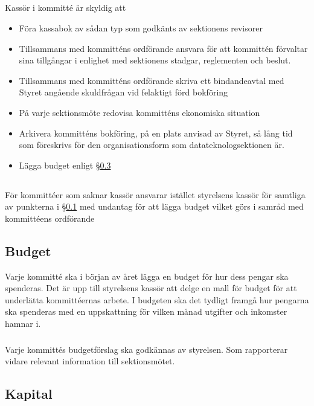 \documentclass[a4paper, 10pt]{article}
\begin{document}
\subsection{}
\label{sec:kommittee_kassor}
Kassör i kommitté är skyldig att
\begin{itemize}
\item Föra kassabok av sådan typ som godkänts av sektionens revisorer
\item Tillsammans med kommitténs ordförande ansvara för att kommittén förvaltar sina tillgångar i enlighet med sektionens stadgar, reglementen och beslut.
\item Tillsammans med kommitténs ordförande skriva ett bindandeavtal med Styret angående skuldfrågan vid felaktigt förd bokföring
\item På varje sektionsmöte redovisa kommitténs ekonomiska situation
\item Arkivera kommitténs bokföring, på en plats anvisad av Styret, så lång tid som föreskrivs för den organisationsform som datateknologsektionen är.
\item Lägga budget enligt \S\ref{sec:budget}
\end{itemize}
\subsection{}
För kommittéer som saknar kassör ansvarar istället styrelsens kassör för samtliga av punkterna i \S\ref{sec:kommittee_kassor} med undantag för att lägga budget vilket görs i samråd med kommittéens ordförande
\subsection{Budget}
\label{sec:budget}
Varje kommitté ska i början av året lägga en budget för hur dess pengar ska spenderas. Det är upp till styrelsens kassör att delge en mall för budget för att underlätta kommittéernas arbete. I budgeten ska det tydligt framgå hur pengarna ska spenderas med en uppskattning för vilken månad utgifter och inkomster hamnar i. 

\subsubsection{}
Varje kommittés budgetförslag ska godkännas av styrelsen. Som rapporterar vidare relevant information till sektionsmötet.


\subsection{Kapital}
\label{sec:sektionsforeningar_startkapital}
\end{document}
